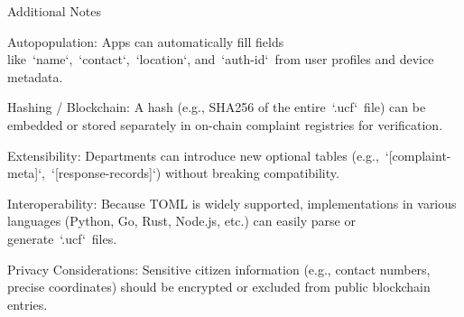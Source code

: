 \documentclass[12pt]{spec}
\begin{document}
\begin{specitemize}{Additional Notes}

  \item Autopopulation:  Apps can automatically fill fields
like `name`, `contact`, `location`, and `auth-id` from user profiles and device
metadata.

  \item Hashing / Blockchain:  A hash (e.g., SHA256 of the entire `.ucf` file)
can be embedded or stored separately in on-chain complaint registries for
verification.

  \item Extensibility:  Departments can introduce new optional tables
(e.g., `[complaint-meta]`, `[response-records]`) without breaking
compatibility.

  \item Interoperability:  Because TOML is widely supported, implementations in
various languages (Python, Go, Rust, Node.js, etc.) can easily parse or
generate `.ucf` files.

  \item Privacy Considerations:  Sensitive citizen information (e.g., contact
numbers, precise coordinates) should be encrypted or excluded from public
blockchain entries.

\end{specitemize}
\end{document}
